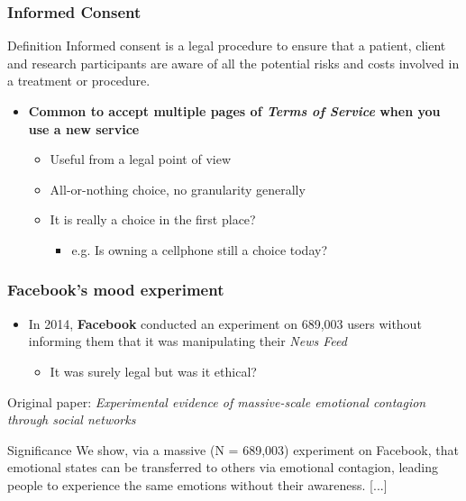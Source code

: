 \documentclass{beamer}
\begin{document}
\begin{frame}\frametitle{Informed Consent}
\begin{block}{Definition}
\justifying
Informed consent is a legal procedure to ensure that a patient, client and research participants are aware of all the potential risks and costs involved in a treatment or procedure.
\end{block}
\begin{itemize}
	\setlength\itemsep{1em}
	\item {\bf Common to accept multiple pages of \textit{Terms of Service} when you use a new service}
	\begin{itemize}
		\item Useful from a legal point of view
		\item All-or-nothing choice, no granularity generally
		\item It is really a choice in the first place?
		\begin{itemize}
			\item e.g. Is owning a cellphone still a choice today?
		\end{itemize}
	\end{itemize}
\end{itemize}
\end{frame}

\begin{frame}\frametitle{Facebook's mood experiment}
\begin{itemize}
	\setlength\itemsep{1em}
	\item In 2014, {\bf Facebook} conducted an experiment on 689,003 users without informing them that it was manipulating their \textit{News Feed}
	\begin{itemize}
		\item It was surely legal but was it ethical?
	\end{itemize}
\end{itemize}
\vspace{1em}
Original paper: \textit{Experimental evidence of massive-scale emotional contagion through social networks}
\begin{block}{Significance}
\justifying
We show, via a massive (N = 689,003) experiment on Facebook, that emotional states can be transferred to others via emotional contagion, leading people to experience the same emotions without their awareness. [...]
\end{block}
\end{frame}
\end{document}
